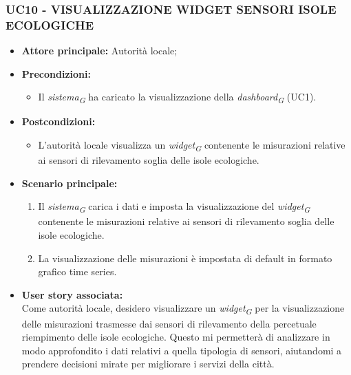 \subsubsection{UC10 - VISUALIZZAZIONE WIDGET SENSORI ISOLE ECOLOGICHE}
\begin{itemize}
    \item \textbf{Attore principale:} Autorità locale;
    \item \textbf{Precondizioni:}
        \begin{itemize}
            \item Il \textit{sistema}\textsubscript{\textit{G}} ha caricato la visualizzazione della \textit{dashboard}\textsubscript{\textit{G}} (UC1).
        \end{itemize}
    \item \textbf{Postcondizioni:}
        \begin{itemize}
            \item L'autorità locale visualizza un \textit{widget}\textsubscript{\textit{G}} contenente le misurazioni relative ai sensori di rilevamento soglia delle isole ecologiche.
        \end{itemize}
        \item \textbf{Scenario principale:}
        \begin{enumerate}
            \item Il \textit{sistema}\textsubscript{\textit{G}} carica i dati e imposta la visualizzazione del \textit{widget}\textsubscript{\textit{G}} contenente le misurazioni relative ai sensori di rilevamento soglia delle isole ecologiche.
            \item La visualizzazione delle misurazioni è impostata di default in formato grafico time
            series.
        \end{enumerate}
    \item \textbf{User story associata:} \\
        Come autorità locale, desidero visualizzare un \textit{widget}\textsubscript{\textit{G}} per la visualizzazione delle misurazioni trasmesse dai sensori di rilevamento della percetuale riempimento delle isole ecologiche. Questo mi permetterà di analizzare in modo approfondito i dati relativi a quella tipologia di sensori, aiutandomi a prendere decisioni mirate per migliorare i servizi della città.
\end{itemize}